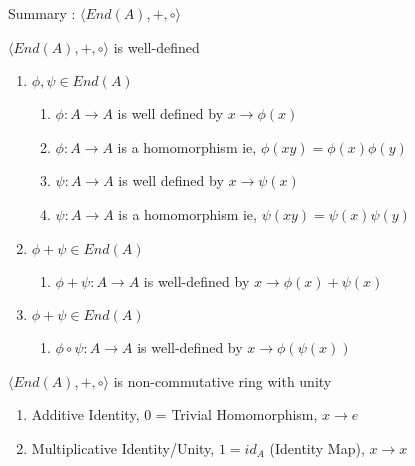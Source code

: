 \documentclass{beamer}
\begin{document}
\begin{frame}{Summary : $\langle End(A),+,\circ \rangle$}
\begin{block}{$\langle End(A),+,\circ \rangle$ is well-defined}
\begin{enumerate}
	\item $\phi, \psi \in End(A)$
	\begin{enumerate}
		\item $\phi : A \to A$ is well defined by $x \to \phi(x)$
		\item $\phi : A \to A$ is a homomorphism ie, $\phi(xy)= \phi(x)\phi(y)$
		\item $\psi : A \to A$ is well defined by $x \to \psi(x)$
		\item $\psi : A \to A$ is a homomorphism ie, $\psi(xy)= \psi(x)\psi(y)$
	\end{enumerate}
	\item $\phi+\psi \in End(A)$
	\begin{enumerate}
		\item $\phi+\psi : A \to A$ is well-defined by $x \to \phi(x)+\psi(x)$
	\end{enumerate}
	\item $\phi+\psi \in End(A)$
	\begin{enumerate}
		\item $\phi\circ\psi : A \to A$ is well-defined by $x \to \phi(\psi(x))$
	\end{enumerate}
\end{enumerate}
\end{block}
\begin{block}{$\langle End(A),+,\circ \rangle$ is non-commutative ring with unity}
\begin{enumerate}
	\item Additive Identity, $0$ = Trivial Homomorphism, $x \to e$
	\item Multiplicative Identity/Unity, $1 = id_A$ (Identity Map), $x \to x$
\end{enumerate}
\end{block}
\end{frame}
\end{document}

